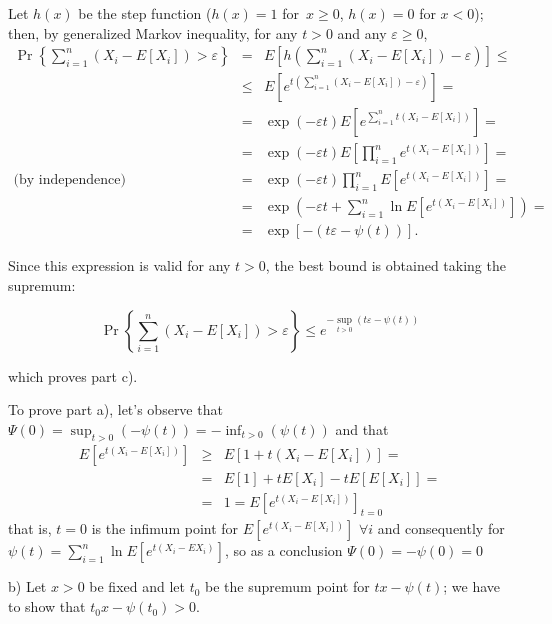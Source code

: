 \documentclass[12pt]{article}
\begin{document}
Let $h(x)$ be the step function ($h(x)=1$ for\ $x\geq 0
$, $h(x)=0$  for $x<0$); then, by generalized Markov inequality, for any $t > 0$ and
any $\varepsilon \geq 0$,
\begin{eqnarray*}
\Pr\left\{ \sum_{i=1}^{n}\left( X_{i}-E[X_{i}]\right) >\varepsilon \right\} 
&=&E\left[ h\left( \sum_{i=1}^{n}\left( X_{i}-E[X_{i}]\right) -\varepsilon
\right) \right] \leq  \\
&\leq &E\left[ e^{t\left( \sum_{i=1}^{n}\left( X_{i}-E[X_{i}]\right)
-\varepsilon \right) }\right] = \\
&=&\exp (-\varepsilon t)E\left[ e^{\sum_{i=1}^{n}t\left(
X_{i}-E[X_{i}]\right) }\right] = \\
&=&\exp (-\varepsilon t)E\left[ \prod_{i=1}^{n}e^{t\left(
X_{i}-E[X_{i}]\right) }\right] = \\
\text{(by independence)} &=&\exp (-\varepsilon t)\prod_{i=1}^{n}E\left[
e^{t\left( X_{i}-E[X_{i}]\right) }\right] = \\
&=&\exp \left( -\varepsilon t+\sum_{i=1}^{n}\ln E\left[ e^{t\left(
X_{i}-E[X_{i}]\right) }\right] \right) = \\
&=&\exp \left[ -\left( t\varepsilon -\psi (t)\right) \right]. 
\end{eqnarray*}


Since this expression is valid for any $t > 0$, the best bound is obtained taking the supremum:

\[
\Pr\left\{ \sum_{i=1}^{n}\left( X_{i}-E[X_{i}]\right) >\varepsilon \right\}
\leq e^{-\sup_{t > 0}\left( t\varepsilon -\psi (t)\right)}
\]

which proves part c).

To prove part a), let's observe that $\Psi (0)=\sup_{t > 0}(-\psi (t))=-\inf_{t > 0}(\psi (t))$
and that
\begin{eqnarray*}
E\left[ e^{t\left( X_{i}-E[X_{i}]\right) }\right]  &\geq &E[1+t\left(
X_{i}-E[X_{i}]\right) ]= \\
&=&E[1]+tE[X_{i}]-tE[E[X_{i}]]= \\
&=&1=E\left[ e^{t\left( X_{i}-E[X_{i}]\right) }\right] _{t=0}
\end{eqnarray*}
that is, $t=0$ is the infimum point for $E\left[ e^{t\left(
X_{i}-E[X_{i}]\right) }\right] $ $\forall i$ and consequently for $\psi
(t)=\sum_{i=1}^{n}\ln E\left[ e^{t\left( X_{i}-EX_{i}\right) }\right] $, so as a conclusion $\Psi (0)=-\psi(0)=0$

b) Let $x>0$ be fixed and let $t_{0}$ be the supremum point for $tx-\psi (t)
$; we have to show that $t_{0}x-\psi (t_{0})>0$.
\end{document}
